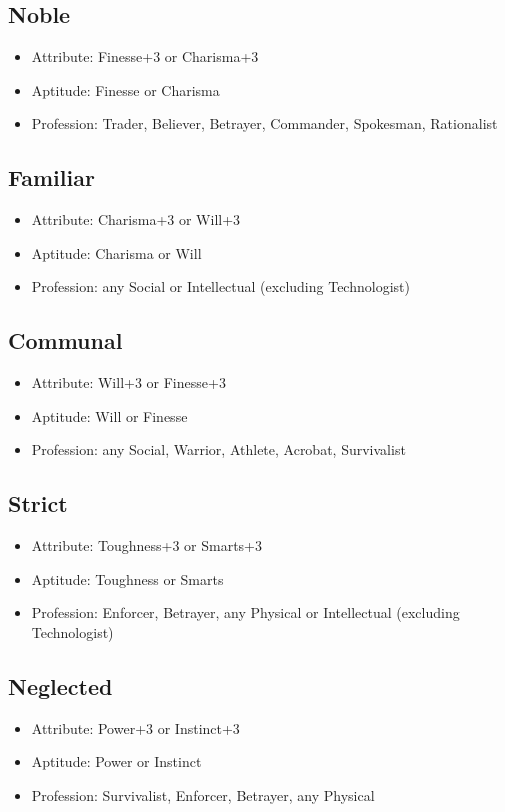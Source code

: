 \subsection{Noble}
\begin{itemize}
	\item Attribute: Finesse+3 or Charisma+3
	\item Aptitude: Finesse or Charisma
	\item Profession: Trader, Believer, Betrayer, Commander, Spokesman, Rationalist
\end{itemize}

\subsection{Familiar}
\begin{itemize}
	\item Attribute: Charisma+3 or Will+3
	\item Aptitude: Charisma or Will
	\item Profession: any Social or Intellectual (excluding Technologist)
\end{itemize}

\subsection{Communal}
\begin{itemize}
	\item Attribute: Will+3 or Finesse+3
	\item Aptitude: Will or Finesse
	\item Profession: any Social, Warrior, Athlete, Acrobat, Survivalist
\end{itemize}

\subsection{Strict}
\begin{itemize}
	\item Attribute: Toughness+3 or Smarts+3
	\item Aptitude: Toughness or Smarts
	\item Profession: Enforcer, Betrayer, any Physical or Intellectual (excluding Technologist)
\end{itemize}

\subsection{Neglected}
\begin{itemize}
	\item Attribute: Power+3 or Instinct+3
	\item Aptitude: Power or Instinct
	\item Profession: Survivalist, Enforcer, Betrayer, any Physical
\end{itemize}

